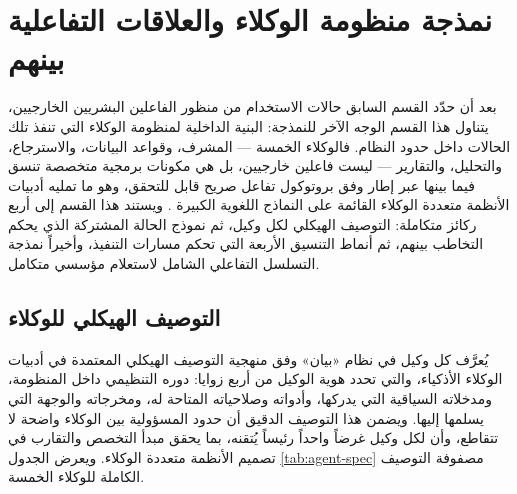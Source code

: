 \section{نمذجة منظومة الوكلاء والعلاقات التفاعلية بينهم}
\label{sec:agent-modeling}

بعد أن حدّد القسم السابق حالات الاستخدام من منظور الفاعلين البشريين الخارجيين، يتناول هذا القسم الوجه الآخر للنمذجة: البنية الداخلية لمنظومة الوكلاء التي تنفذ تلك الحالات داخل حدود النظام. فالوكلاء الخمسة --- المشرف، وقواعد البيانات، والاسترجاع، والتحليل، والتقارير --- ليست فاعلين خارجيين، بل هي مكونات برمجية متخصصة تنسق فيما بينها عبر إطار  \cite{langgraph2024} وفق بروتوكول تفاعل صريح قابل للتحقق، وهو ما تمليه أدبيات الأنظمة متعددة الوكلاء القائمة على النماذج اللغوية الكبيرة \cite{wu2023autogen}. ويستند هذا القسم إلى أربع ركائز متكاملة: التوصيف الهيكلي لكل وكيل، ثم نموذج الحالة المشتركة الذي يحكم التخاطب بينهم، ثم أنماط التنسيق الأربعة التي تحكم مسارات التنفيذ، وأخيراً نمذجة التسلسل التفاعلي الشامل لاستعلام مؤسسي متكامل.

\subsection{التوصيف الهيكلي للوكلاء}
\label{subsec:agent-specification}

يُعرَّف كل وكيل في نظام «بيان» وفق منهجية التوصيف الهيكلي المعتمدة في أدبيات الوكلاء الأذكياء، والتي تحدد هوية الوكيل من أربع زوايا: دوره التنظيمي داخل المنظومة، ومدخلاته السياقية التي يدركها، وأدواته وصلاحياته المتاحة له، ومخرجاته والوجهة التي يسلمها إليها. ويضمن هذا التوصيف الدقيق أن حدود المسؤولية بين الوكلاء واضحة لا تتقاطع، وأن لكل وكيل غرضاً واحداً رئيساً يُتقنه، بما يحقق مبدأ التخصص والتقارب في تصميم الأنظمة متعددة الوكلاء. ويعرض الجدول \ref{tab:agent-spec} مصفوفة التوصيف الكاملة للوكلاء الخمسة.

